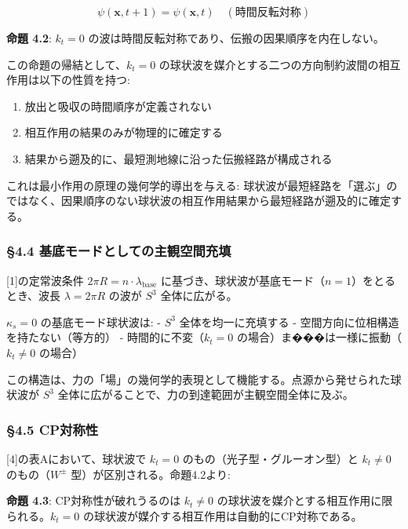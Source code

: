 \documentclass[
  a4paper,11pt]{ltjsarticle}
\providecommand{\tightlist}{%
  \setlength{\itemsep}{0pt}\setlength{\parskip}{0pt}}
\theoremstyle{definition}
\theoremstyle{remark}
\begin{document}
\[\psi(\mathbf{x}, t + 1) = \psi(\mathbf{x}, t) \quad (\text{時間反転対称})\]

\textbf{命題 4.2}: \(k_t = 0\)
の波は時間反転対称であり、伝搬の因果順序を内在しない。

この命題の帰結として、\(k_t = 0\)
の球状波を媒介とする二つの方向制約波間の相互作用は以下の性質を持つ:

\begin{enumerate}
\def\labelenumi{\arabic{enumi}.}
\tightlist
\item
  放出と吸収の時間順序が定義されない
\item
  相互作用の結果のみが物理的に確定する
\item
  結果から遡及的に、最短測地線に沿った伝搬経路が構成される
\end{enumerate}

これは最小作用の原理の幾何学的導出を与える:
球状波が最短経路を「選ぶ」のではなく、因果順序のない球状波の相互作用結果から最短経路が遡及的に確定する。

\subsubsection{§4.4
基底モードとしての主観空間充填}\label{ux57faux5e95ux30e2ux30fcux30c9ux3068ux3057ux3066ux306eux4e3bux89b3ux7a7aux9593ux5145ux586b}

{[}1{]}の定常波条件 \(2\pi R = n \cdot \lambda_{\text{base}}\)
に基づき、球状波が基底モード（\(n = 1\)）をとるとき、波長
\(\lambda = 2\pi R\) の波が \(S^3\) 全体に広がる。

\(\kappa_s = 0\) の基底モード球状波は: - \(S^3\) 全体を均一に充填する -
空間方向に位相構造を持たない（等方的） - 時間的に不変（\(k_t = 0\)
の場合）ま���は一様に振動（\(k_t \neq 0\) の場合）

この構造は、力の「場」の幾何学的表現として機能する。点源から発せられた球状波が
\(S^3\) 全体に広がることで、力の到達範囲が主観空間全体に及ぶ。

\subsubsection{§4.5 CP対称性}\label{cpux5bfeux79f0ux6027}

{[}4{]}の表Aにおいて、球状波で \(k_t = 0\)
のもの（光子型・グルーオン型）と \(k_t \neq 0\) のもの（\(W^{\pm}\)
型）が区別される。命題4.2より:

\textbf{命題 4.3}: CP対称性が破れうるのは \(k_t \neq 0\)
の球状波を媒介とする相互作用に限られる。\(k_t = 0\)
の球状波が媒介する相互作用は自動的にCP対称である。
\end{document}
